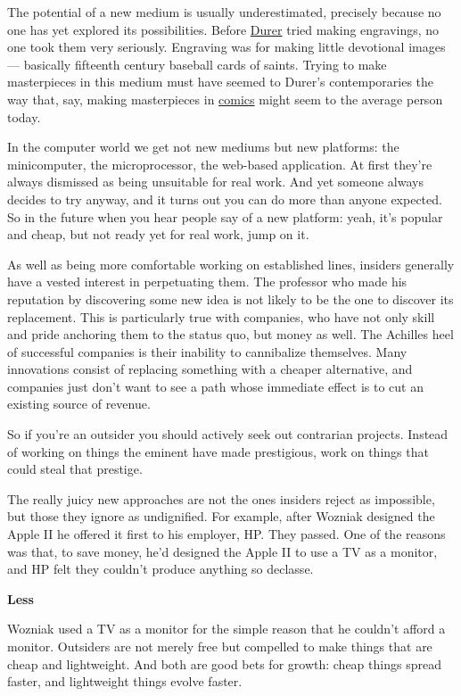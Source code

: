 \documentclass[12pt]{book}
\begin{document}
The potential of a new medium is usually underestimated, precisely
because no one has yet explored its possibilities. Before
\href{pilate.html}{Durer} tried making engravings, no one took them very
seriously. Engraving was for making little devotional images ---
basically fifteenth century baseball cards of saints. Trying to make
masterpieces in this medium must have seemed to Durer's contemporaries
the way that, say, making masterpieces in
\href{http://www.fantagraphics.com/artist/clowes/clowes.html}{comics}
might seem to the average person today.

In the computer world we get not new mediums but new platforms: the
minicomputer, the microprocessor, the web-based application. At first
they're always dismissed as being unsuitable for real work. And yet
someone always decides to try anyway, and it turns out you can do more
than anyone expected. So in the future when you hear people say of a new
platform: yeah, it's popular and cheap, but not ready yet for real work,
jump on it.

As well as being more comfortable working on established lines, insiders
generally have a vested interest in perpetuating them. The professor who
made his reputation by discovering some new idea is not likely to be the
one to discover its replacement. This is particularly true with
companies, who have not only skill and pride anchoring them to the
status quo, but money as well. The Achilles heel of successful companies
is their inability to cannibalize themselves. Many innovations consist
of replacing something with a cheaper alternative, and companies just
don't want to see a path whose immediate effect is to cut an existing
source of revenue.

So if you're an outsider you should actively seek out contrarian
projects. Instead of working on things the eminent have made
prestigious, work on things that could steal that prestige.

The really juicy new approaches are not the ones insiders reject as
impossible, but those they ignore as undignified. For example, after
Wozniak designed the Apple II he offered it first to his employer, HP.
They passed. One of the reasons was that, to save money, he'd designed
the Apple II to use a TV as a monitor, and HP felt they couldn't produce
anything so declasse.

\textbf{Less}

Wozniak used a TV as a monitor for the simple reason that he couldn't
afford a monitor. Outsiders are not merely free but compelled to make
things that are cheap and lightweight. And both are good bets for
growth: cheap things spread faster, and lightweight things evolve
faster.
\end{document}
